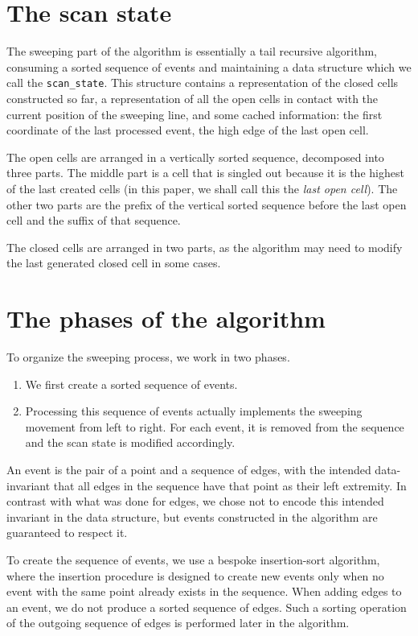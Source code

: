 \documentclass[a4paper, USenglish, cleveref, autoref, thm-restate, final]{lipics-v2021}
\begin{document}
\section{The scan state}

The sweeping part of the algorithm is essentially a tail recursive
algorithm, consuming a sorted sequence of events and
maintaining a data structure which we call the {\tt scan\_state}.  This
structure contains a representation of the closed cells constructed so
far, a representation of all the open cells in contact with the
current position of the sweeping line, and some cached information:
the first coordinate of the last processed event, the high edge of the
last open cell.

The open cells are arranged in a vertically sorted sequence,
decomposed into three parts.  The middle part is a cell that is singled
out because it is the highest of the last created cells (in this
paper, we shall call this the {\em last open cell}).  The other two
parts are the prefix of the vertical sorted sequence before the last
open cell and the suffix of that sequence.

The closed cells are arranged in two parts, as the algorithm may need
to modify the last generated closed cell in some cases.

\section{The phases of the algorithm}
To organize the sweeping process, we work in two phases.
\begin{enumerate}
\item  We first
create a sorted sequence of events.
\item Processing this sequence of
  events actually implements the sweeping movement from left to right.
  For each event, it is removed from the sequence and the scan state
  is modified accordingly.
\end{enumerate}

An event is the pair of a point and a sequence of edges, with the
intended data-invariant
that all edges in the sequence have that point as their left
extremity.  In contrast with what was done for edges, we chose not
to encode this intended invariant in the data structure, but
events constructed in the algorithm are guaranteed to respect it.

To create the sequence of events,
we use a bespoke insertion-sort algorithm, where the insertion
procedure is designed to create new events only when no event with the
same point already exists in the sequence.  When adding edges to an
event, we do not produce a sorted sequence of edges.  Such a sorting
operation of the outgoing sequence of edges is performed later in the
algorithm.
\end{document}
